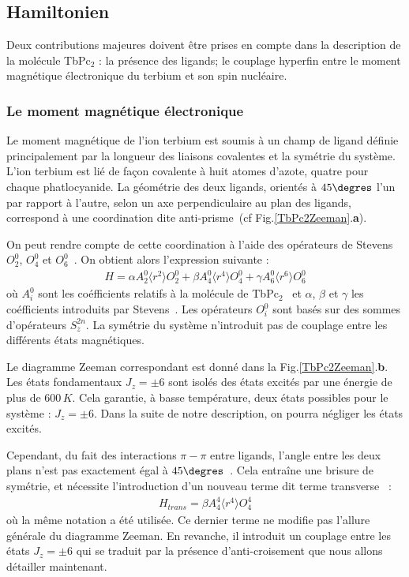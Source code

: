 \subsection{Hamiltonien}

Deux contributions majeures doivent être prises en compte dans la description de la molécule TbPc$_{2}$ : la présence des ligands; le couplage hyperfin entre le moment magnétique électronique du terbium et son spin nucléaire.

\subsubsection{Le moment magnétique électronique}
Le moment magnétique de l'ion terbium est soumis à un champ de ligand définie principalement par la longueur des liaisons covalentes et la symétrie du système. 
L'ion terbium est lié de façon covalente à huit atomes d'azote, quatre pour chaque phatlocyanide. La géométrie des deux ligands, orientés à $45\degres$ l'un par rapport à l'autre, selon un axe perpendiculaire au plan des ligands, correspond à une coordination dite anti-prisme~(cf Fig.\ref{TbPc2Zeeman}.\textbf{a}). 

On peut rendre compte de cette coordination à l'aide des opérateurs de Stevens $O_2^0$, $O_4^0$ et $O_6^0$~\cite{Stevens1952,Sorace2011}. On obtient alors l'expression suivante :
\begin{eqnarray}
H = \alpha A_2^0 \langle r^2 \rangle O_2^0 + \beta A_4^0 \langle r^4 \rangle O_4^0 + \gamma A_6^0 \langle r^6 \rangle O_6^0
\end{eqnarray}
où $A_i^0$ sont les coéfficients relatifs à la molécule de TbPc$_2$~\cite{Ishikawa2005} et $\alpha$, $\beta$ et $\gamma$ les coéfficients introduits par Stevens~\cite{Stevens1952}. Les opérateurs $O^0_i$ sont basés sur des sommes d'opérateurs $S_z^{2n}$. La symétrie du système n'introduit pas de couplage entre les différents états magnétiques. 

Le diagramme Zeeman correspondant est donné dans la Fig.\ref{TbPc2Zeeman}.\textbf{b}. Les états fondamentaux $J_z = \pm 6$ sont isolés des états excités par une énergie de plus de $600\,K$. Cela garantie, à basse température, deux états possibles pour le système : $J_z = \pm 6$. Dans la suite de notre description, on pourra négliger les états excités.

 
Cependant, du fait des interactions $\pi - \pi$ entre ligands, l'angle entre les deux plans n'est pas exactement égal à $45\degres$~\cite{Koike1996}. Cela entraîne une brisure de symétrie, et nécessite l'introduction d'un nouveau terme dit terme transverse~\cite{Sorace2011} :
\begin{eqnarray}
H_{trans} = \beta A_4^4 \langle r^4 \rangle O_4^4
\end{eqnarray}
où la m\^eme notation a été utilisée. Ce dernier terme ne modifie pas l'allure générale du diagramme Zeeman. En revanche, il introduit un couplage entre les états  $J_z = \pm 6$ qui se traduit par la présence d'anti-croisement que nous allons détailler maintenant.

